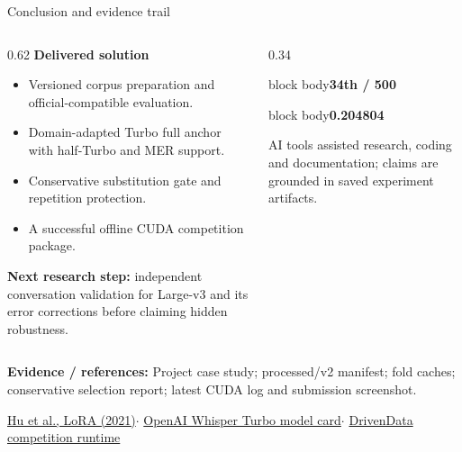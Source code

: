 \documentclass[aspectratio=169,11pt]{beamer}
\newcommand{\metric}[2]{\begin{beamercolorbox}[sep=3mm,center,wd=\linewidth]{block body}{\LARGE\bfseries\color{teal}#1}\par\vspace{1mm}{\small #2}\end{beamercolorbox}}
\begin{document}
\begin{frame}{Conclusion and evidence trail}
\begin{columns}[T]
\begin{column}{0.62\textwidth}
\textbf{Delivered solution}
\begin{itemize}\item Versioned corpus preparation and official-compatible evaluation.
\item Domain-adapted Turbo full anchor with half-Turbo and MER support.
\item Conservative substitution gate and repetition protection.
\item A successful offline CUDA competition package.
\end{itemize}
\vspace{2mm}
\textbf{Next research step:} independent conversation validation for Large-v3 and its error corrections before claiming hidden robustness.
\end{column}
\begin{column}{0.34\textwidth}
\metric{34th / 500}{Team-reported final leaderboard position}
\vspace{3mm}\metric{0.204804}{Submitted system local OOF WER}
\vspace{3mm}\small\color{slate}AI tools assisted research, coding and documentation; claims are grounded in saved experiment artifacts.
\end{column}
\end{columns}
\vfill
{\scriptsize\color{slate}\textbf{Evidence / references:} Project case study; processed/v2 manifest; fold caches; conservative selection report; latest CUDA log and submission screenshot.\par
\href{https://arxiv.org/abs/2106.09685}{Hu et al., LoRA (2021)}\quad$\cdot$\quad
\href{https://huggingface.co/openai/whisper-large-v3-turbo}{OpenAI Whisper Turbo model card}\quad$\cdot$\quad
\href{https://github.com/drivendataorg/lost-in-transcription-runtime}{DrivenData competition runtime}}
\end{frame}
\end{document}
